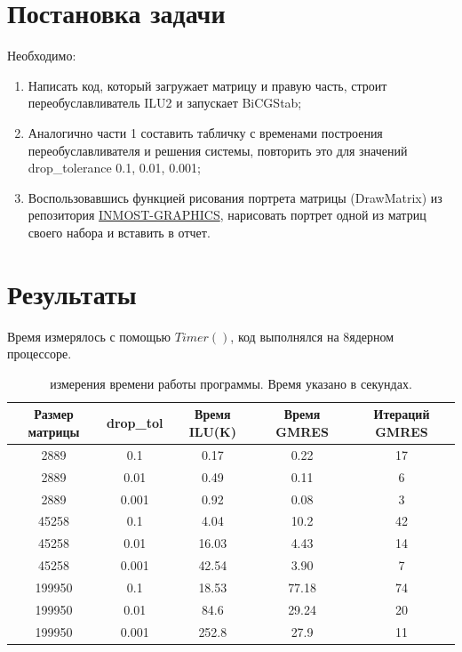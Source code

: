 


	\tableofcontents
	
	\section{Постановка задачи}
	Необходимо:
	\begin{enumerate}
		\item Написать код, который загружает матрицу и правую часть, строит переобуславливатель ILU2 и запускает BiCGStab;
		\item Аналогично части 1 составить табличку с временами построения переобуславливателя и решения системы, повторить это для значений drop\_tolerance 0.1, 0.01, 0.001;
		\item Воспользовавшись функцией рисования портрета матрицы (DrawMatrix) из репозитория \href{https://github.com/INMOST-DEV/INMOST-Graphics}{INMOST-GRAPHICS}, нарисовать портрет одной из матриц своего набора и вставить в отчет.
	\end{enumerate}
	
	\section{Результаты}
	
	Время измерялось с помощью $Timer()$, код выполнялся на 8ядерном процессоре.
	
	\begin{table}[h!]
		\centering
		\begin{tabular}{ | c | c | c | c | c | }
			\hline
			Размер матрицы & drop\_tol & Время ILU(K) & Время GMRES & Итераций GMRES\\  [0.3ex]
			\hline\hline
			2889 & 0.1 & 0.17 & 0.22 & 17 \\
			\hline
			2889 & 0.01 & 0.49 & 0.11 & 6 \\
			\hline
			2889 & 0.001 & 0.92 & 0.08 & 3 \\
			\hline
			45258 & 0.1 & 4.04  & 10.2 & 42 \\  
			\hline
			45258 & 0.01 & 16.03 & 4.43 & 14 \\
			\hline
			45258 & 0.001 & 42.54 & 3.90 & 7 \\ 
			\hline 
			199950 & 0.1 & 18.53 & 77.18 & 74 \\
			\hline
			199950 & 0.01 & 84.6 & 29.24 & 20 \\
			\hline
			199950 & 0.001 & 252.8 & 27.9& 11 \\
			\hline
			\hline
		\end{tabular}
		\caption{измерения времени работы программы. Время указано в секундах.}
		\label{table:1}
	\end{table}
	
